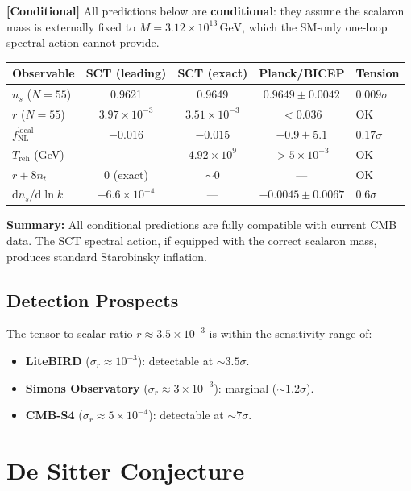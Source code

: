 \documentclass[11pt,a4paper]{article}
\renewcommand{\dd}{\mathrm{d}}
\theoremstyle{plain}
\theoremstyle{definition}
\newcommand{\conditional}[1]{%
  \par\smallskip\noindent
  \colorbox{yellow!15}{\parbox{\dimexpr\linewidth-2\fboxsep}{%
    \textcolor{orange!60!black}{\textbf{[Conditional]}} #1}}%
  \par\smallskip}
\begin{document}
\conditional{All predictions below are \textbf{conditional}: they assume
the scalaron mass is externally fixed to
$M = 3.12 \times 10^{13}\,\mathrm{GeV}$, which the SM-only one-loop
spectral action cannot provide.}

\begin{center}
\begin{tabular}{lcccl}
\toprule
Observable & SCT (leading) & SCT (exact) & Planck/BICEP & Tension \\
\midrule
$n_s$ ($N = 55$) & 0.9621 & 0.9649 & $0.9649 \pm 0.0042$ & $0.009\sigma$ \\
$r$ ($N = 55$) & $3.97 \times 10^{-3}$ & $3.51 \times 10^{-3}$ & $< 0.036$ & OK \\
$f_{\mathrm{NL}}^{\mathrm{local}}$ & $-0.016$ & $-0.015$ & $-0.9 \pm 5.1$ & $0.17\sigma$ \\
$T_{\mathrm{reh}}$ (GeV) & --- & $4.92 \times 10^9$ & $> 5 \times 10^{-3}$ & OK \\
$r + 8n_t$ & 0 (exact) & $\sim 0$ & --- & OK \\
$\dd n_s / \dd\ln k$ & $-6.6 \times 10^{-4}$ & --- & $-0.0045 \pm 0.0067$ & $0.6\sigma$ \\
\bottomrule
\end{tabular}
\end{center}

\textbf{Summary:} All conditional predictions are fully compatible with
current CMB data.  The SCT spectral action, if equipped with the correct
scalaron mass, produces standard Starobinsky inflation.

\subsection{Detection Prospects}

The tensor-to-scalar ratio $r \approx 3.5 \times 10^{-3}$ is within the
sensitivity range of:
\begin{itemize}[nosep]
  \item \textbf{LiteBIRD} ($\sigma_r \approx 10^{-3}$): detectable at
    $\sim 3.5\sigma$.
  \item \textbf{Simons Observatory} ($\sigma_r \approx 3 \times 10^{-3}$):
    marginal ($\sim 1.2\sigma$).
  \item \textbf{CMB-S4} ($\sigma_r \approx 5 \times 10^{-4}$): detectable at
    $\sim 7\sigma$.
\end{itemize}

\section{De Sitter Conjecture}\label{sec:de-sitter}
\end{document}
